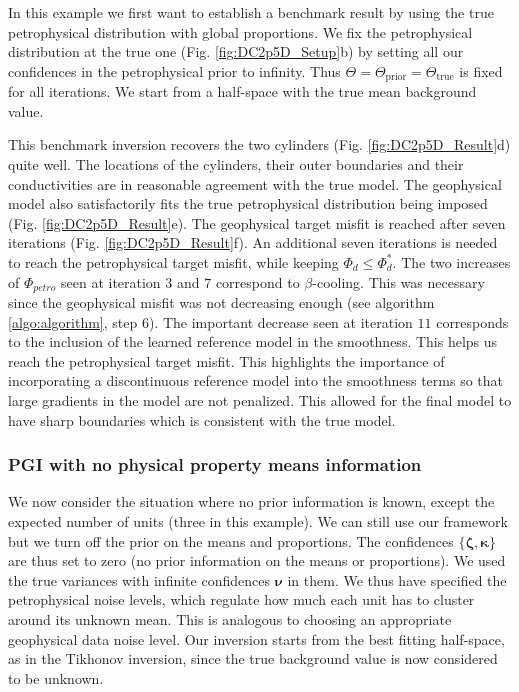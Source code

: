 \documentclass[extra]{gji} %
\begin{document}
In this example we first want to establish a benchmark result by using the true petrophysical distribution with global proportions. We fix the petrophysical distribution at the true one (Fig. \ref{fig:DC2p5D_Setup}b) by setting all our confidences in the petrophysical prior to infinity. Thus $\Theta=\Theta_{\text{prior}}=\Theta_{\text{true}}$ is fixed for all iterations. We start from a half-space with the true mean background value.

This benchmark inversion recovers the two cylinders (Fig. \ref{fig:DC2p5D_Result}d) quite well. The locations of the cylinders, their outer boundaries and their conductivities are in reasonable agreement with the true model. The geophysical model also satisfactorily fits the true petrophysical distribution being imposed (Fig. \ref{fig:DC2p5D_Result}e). The geophysical target misfit is reached after seven iterations (Fig. \ref{fig:DC2p5D_Result}f). An additional seven iterations is needed to reach the petrophysical target misfit, while keeping $\Phi_d\leq\Phi_d^*$. The two increases of $\Phi_{petro}$ seen at iteration $3$ and $7$ correspond to $\beta$-cooling.  This was necessary since the geophysical misfit was not decreasing enough (see algorithm \ref{algo:algorithm}, step 6). The important decrease seen at iteration $11$ corresponds to the inclusion of the learned reference model in the smoothness. This helps us reach the petrophysical target misfit. This highlights the importance of incorporating a discontinuous reference model into the smoothness terms so that large gradients in the model are not penalized. This allowed for the final model to have sharp boundaries which is consistent with the true model.

\subsubsection{PGI with no physical property means information}

We now consider the situation where no prior information is known, except the expected number of units (three in this example). We can still use our framework but we turn off the prior on the means and proportions. The confidences $\{\mathbf{\zeta},\mathbf{\kappa}\}$ are thus set to zero (no prior information on the means or proportions). We used the true variances with infinite confidences $\mathbf{\nu}$ in them. We thus have specified the petrophysical noise levels, which regulate how much each unit has to cluster around its unknown mean. This is analogous to choosing an appropriate geophysical data noise level. Our inversion starts from the best fitting half-space, as in the Tikhonov inversion, since the true background value is now considered to be unknown.
\end{document}
